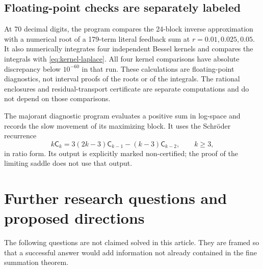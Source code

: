 \documentclass[11pt,a4paper]{article}
\numberwithin{equation}{section}
\theoremstyle{definition}
\theoremstyle{remark}
\newcommand{\sh}{\mathsf C}
\begin{document}
\subsection{Floating-point checks are separately labeled}
At 70 decimal digits, the program compares the 24-block inverse
approximation with a numerical root of a 179-term literal feedback sum
at $r=0.01,0.025,0.05$.  It also numerically integrates four independent
Bessel kernels and compares the integrals with
\eqref{eq:kernel-laplace}.  All four kernel comparisons have absolute
discrepancy below $10^{-60}$ in that run.  These calculations are
floating-point diagnostics, not interval proofs of the roots or of the
integrals.  The rational enclosures and residual-transport certificate
are separate computations and do not depend on those comparisons.

The majorant diagnostic program evaluates a positive sum in log-space
and records the slow movement of its maximizing block.  It uses the
Schr\"oder recurrence
\[
 k\sh_k=3(2k-3)\sh_{k-1}-(k-3)\sh_{k-2},\qquad k\ge3,
\]
in ratio form.  Its output is explicitly marked non-certified; the proof
of the limiting saddle does not use that output.

\section{Further research questions and proposed directions}
\label{sec:questions}

The following questions are not claimed solved in this article.  They
are framed so that a successful answer would add information not already
contained in the fine summation theorem.
\end{document}
